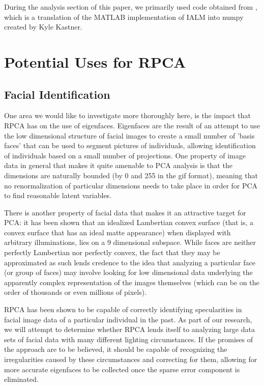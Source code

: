 \documentclass[11pt]{scrartcl} %
\theoremstyle{plain}
\begin{document}
During the analysis section of this paper, we primarily used code obtained from \cite{usedcode}, which is a translation of the MATLAB implementation of IALM into numpy created by Kyle Kastner.

\section{Potential Uses for RPCA}

\subsection{Facial Identification}
One area we would like to investigate more thoroughly here, is the impact that RPCA has on the use of eigenfaces. Eigenfaces are the result of an attempt to use the low dimensional structure of facial images to create a small number of 'basis faces' that can be used to segment pictures of individuals, allowing identification of individuals based on a small number of projections. One property of image data in general that makes it quite amenable to PCA analysis is that the dimensions are naturally bounded (by 0 and 255 in the gif format), meaning that no renormalization of particular dimensions needs to take place in order for PCA to find reasonable latent variables.

There is another property of facial data that makes it an attractive target for PCA: it has been shown that an idealized Lambertian convex surface (that is, a convex surface that has an ideal matte appearance) when displayed with arbitrary illuminations, lies on a 9 dimensional subspace\cite{lambertian}. While faces are neither perfectly Lambertian nor perfectly convex, the fact that they may be approximated as such lends credence to the idea that analyzing a particular face (or group of faces) may involve looking for low dimensional data underlying the apparently complex representation of the images themselves (which can be on the order of thousands or even millions of pixels).

RPCA has been shown to be capable of correctly identifying specularities in facial image data of a particular individual in the past\cite{rpca}. As part of our research, we will attempt to determine whether RPCA lends itself to analyzing large data sets of facial data with many different lighting circumstances. If the promises of the approach are to be believed, it should be capable of recognizing the irregularities caused by these circumstances and correcting for them, allowing for more accurate eigenfaces to be collected once the sparse error component is eliminated.
\end{document}
